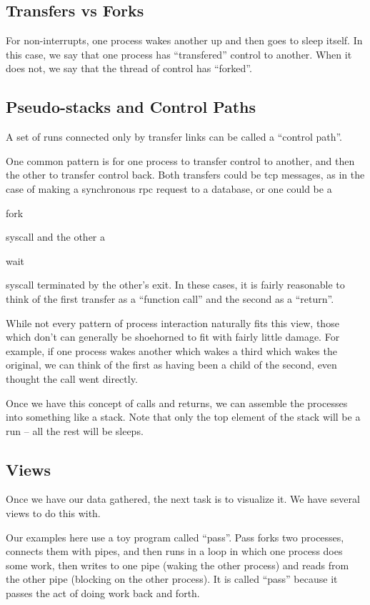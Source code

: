 \documentclass[10pt]{article}
\begin{document}
\subsection{Transfers vs Forks}

For non-interrupts, one process wakes another up and then goes to sleep itself.  In this case, we say that one process has ``transfered'' control to another.  When it does not, we say that the thread of control has ``forked''.

\subsection{Pseudo-stacks and Control Paths}

A set of runs connected only by transfer links can be called a ``control path''.

One common pattern is for one process to transfer control to another, and then the other to transfer control back.  Both transfers could be tcp messages, as in the case of making a synchronous rpc request to a database, or one could be a \begin{tt}fork\end{tt} syscall and the other a \begin{tt}wait\end{tt} syscall terminated by the other's exit.  In these cases, it is fairly reasonable to think of the first transfer as a ``function call'' and the second as a ``return''.

While not every pattern of process interaction naturally fits this view, those which don't can generally be shoehorned to fit with fairly little damage.  For example, if one process wakes another which wakes a third which wakes the original, we can think of the first as having been a child of the second, even thought the call went directly.

Once we have this concept of calls and returns, we can assemble the processes into something like a stack.  Note that only the top element of the stack will be a run -- all the rest will be sleeps.

\subsection{Views}

Once we have our data gathered, the next task is to visualize it.  We have several views to do this with.

Our examples here use a toy program called ``pass''.  Pass forks two processes, connects them with pipes, and then runs in a loop in which one process does some work, then writes to one pipe (waking the other process) and reads from the other pipe (blocking on the other process).  It is called ``pass'' because it passes the act of doing work back and forth.
\end{document}
